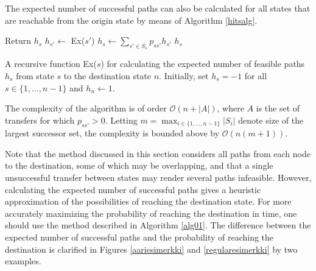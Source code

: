 \documentclass[dissertation,draft*]{aaltoseries}
\begin{document}
The expected number of successful paths can also be calculated for all states that are reachable from the 
origin state by means of Algorithm \ref{hitsalg}. 
\begin{algorithm}
\begin{algorithmic}
{\small
{}
\STATE Return $h_s$\;
\ENDIF
{}
\STATE $h_{s'} \leftarrow $ Ex($s'$)\; 
\ENDFOR
\STATE $h_s \leftarrow \sum_{s' \in S_s} p_{ss'} h_{s'}$\;
\RETURN $h_s$\;
}
\end{algorithmic}
\caption{ A recursive function Ex($s$) for calculating the expected number of feasible 
paths $h_s$ from state $s$ to the destination state $n$. 
Initially, set $h_s=-1$ for all $s \in \{1,\ldots,n-1\}$ and $h_n \leftarrow 1$.}
\label{hitsalg}
\end{algorithm}
The complexity of the algorithm is of order $\mathcal{O}(n+|A|)$, where $A$ is the set of transfers for which $p_{ss'} > 0$.
Letting $m = \max_{i \in \{1,\ldots,n-1\}} |S_i|$ denote size of the largest successor set, the complexity
is bounded above by $\mathcal{O}(n(m+1))$.

Note that the method discussed in this section considers all paths from each node to the destination, 
some of which may be overlapping, and that a single unsuccessful transfer between states may render
several paths infeasible. However, calculating the expected number of successful paths gives a  
heuristic approximation of the possibilities of reaching the destination state. For more accurately maximizing the probability
of reaching the destination in time, one should use the method described in Algorithm \ref{alg01}. 
The difference between the 
expected number of successful paths and the probability of reaching the destination is
clarified in Figures \ref{aariesimerkki} and \ref{regularesimerkki} by two examples.
\end{document}
